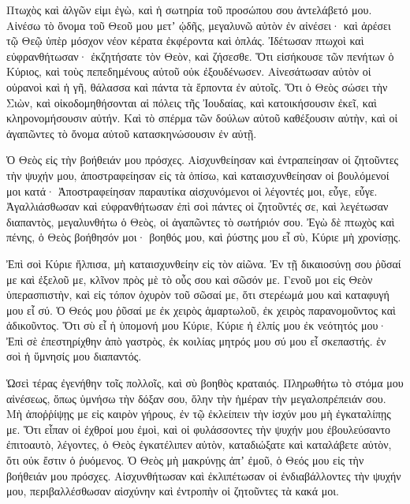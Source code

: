 \begin{spacing}{1.1}
\begin{multicols}{2}
Πτωχὸς καὶ ἀλγῶν εἰμι ἐγὼ, καὶ ἡ σωτηρία τοῦ προσώπου σου ἀντελάβετό μου.
Αἰνέσω τὸ ὄνομα τοῦ Θεοῦ μου μετʼ ᾠδῆς, μεγαλυνῶ αὐτὸν ἐν αἰνέσει·
καὶ ἀρέσει τῷ Θεῷ ὑπὲρ μόσχον νέον κέρατα ἐκφέροντα καὶ ὁπλάς.
Ἰδέτωσαν πτωχοὶ καὶ εὐφρανθήτωσαν· ἐκζητήσατε τὸν Θεὸν, καὶ ζήσεσθε.
Ὅτι εἰσήκουσε τῶν πενήτων ὁ Κύριος, καὶ τοὺς πεπεδημένους αὐτοῦ οὐκ ἐξουδένωσεν.
Αἰνεσάτωσαν αὐτὸν οἱ οὐρανοὶ καὶ ἡ γῆ, θάλασσα καὶ πάντα τὰ ἕρποντα ἐν αὐτοῖς.
Ὅτι ὁ Θεὸς σώσει τὴν Σιὼν, καὶ οἰκοδομηθήσονται αἱ πόλεις τῆς Ἰουδαίας, καὶ κατοικήσουσιν ἐκεῖ, καὶ κληρονομήσουσιν αὐτήν.
Καὶ τὸ σπέρμα τῶν δούλων αὐτοῦ καθέξουσιν αὐτὴν, καὶ οἱ ἀγαπῶντες τὸ ὄνομα αὐτοῦ κατασκηνώσουσιν ἐν αὐτῇ.

Ὁ Θεὸς εἰς τὴν βοήθειάν μου πρόσχες.
Αἰσχυνθείησαν καὶ ἐντραπείησαν οἱ ζητοῦντες τὴν ψυχήν μου, ἀποστραφείησαν εἰς τὰ ὀπίσω, καὶ καταισχυνθείησαν οἱ βουλόμενοί μοι κατά·
Ἀποστραφείησαν παραυτίκα αἰσχυνόμενοι οἱ λέγοντές μοι, εὖγε, εὖγε.
Ἀγαλλιάσθωσαν καὶ εὐφρανθήτωσαν ἐπὶ σοὶ πάντες οἱ ζητοῦντές σε, καὶ λεγέτωσαν διαπαντὸς, μεγαλυνθήτω ὁ Θεὸς, οἱ ἀγαπῶντες τὸ σωτήριόν σου.
Ἐγὼ δὲ πτωχὸς καὶ πένης, ὁ Θεὸς βοήθησόν μοι· βοηθός μου, καὶ ῥύστης μου εἶ σὺ, Κύριε μὴ χρονίσῃς.

Ἐπὶ σοὶ Κύριε ἤλπισα, μὴ καταισχυνθείην εἰς τὸν αἰῶνα.
Ἐν τῇ δικαιοσύνῃ σου ῥῦσαί με καὶ ἐξελοῦ με, κλῖνον πρὸς μὲ τὸ οὖς σου καὶ σῶσόν με.
Γενοῦ μοι εἰς Θεὸν ὑπερασπιστὴν, καὶ εἰς τόπον ὀχυρὸν τοῦ σῶσαί με, ὅτι στερέωμά μου καὶ καταφυγή μου εἶ σύ.
Ὁ Θεός μου ῥῦσαί με ἐκ χειρὸς ἁμαρτωλοῦ, ἐκ χειρὸς παρανομοῦντος καὶ ἀδικοῦντος.
Ὅτι σὺ εἶ ἡ ὑπομονή μου Κύριε, Κύριε ἡ ἐλπίς μου ἐκ νεότητός μου·
Ἐπὶ σὲ ἐπεστηρίχθην ἀπὸ γαστρὸς, ἐκ κοιλίας μητρός μου σύ μου εἶ σκεπαστής. ἐν σοὶ ἡ ὕμνησίς μου διαπαντός.

Ὡσεὶ τέρας ἐγενήθην τοῖς πολλοῖς, καὶ σὺ βοηθὸς κραταιός.
Πληρωθήτω τὸ στόμα μου αἰνέσεως, ὅπως ὑμνήσω τὴν δόξαν σου, ὅλην τὴν ἡμέραν τὴν μεγαλοπρέπειάν σου.
Μὴ ἀποῤῥίψῃς με εἰς καιρὸν γήρους, ἐν τῷ ἐκλείπειν τὴν ἰσχύν μου μὴ ἐγκαταλίπῃς με.
Ὅτι εἶπαν οἱ ἐχθροί μου ἐμοὶ, καὶ οἱ φυλάσσοντες τὴν ψυχήν μου ἐβουλεύσαντο ἐπιτοαυτὸ,
λέγοντες, ὁ Θεὸς ἐγκατέλιπεν αὐτὸν, καταδιώξατε καὶ καταλάβετε αὐτὸν, ὅτι οὐκ ἔστιν ὁ ῥυόμενος.
Ὁ Θεὸς μὴ μακρύνῃς ἀπʼ ἐμοῦ,
ὁ Θεός μου εἰς τὴν βοήθειάν μου πρόσχες. Αἰσχυνθήτωσαν καὶ ἐκλιπέτωσαν οἱ ἐνδιαβάλλοντες τὴν ψυχήν μου, περιβαλλέσθωσαν αἰσχύνην καὶ ἐντροπὴν οἱ ζητοῦντες τὰ κακά μοι.


\end{multicols}
\end{spacing}

